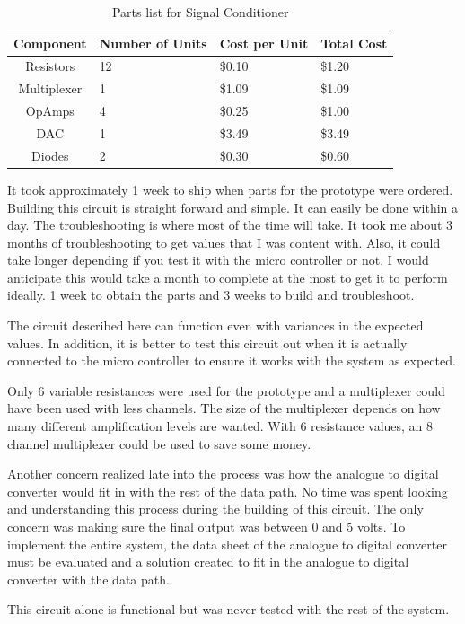 \begin{table}[hbp]
\caption[Signal Conditioner parts]{Parts list for Signal Conditioner}
\begin{center}
\begin{tabular}{c | l | l | l}
	Component & Number of Units & Cost per Unit & Total Cost \\\hline
	Resistors & 12 & \$0.10 & \$1.20 \\ 
	Multiplexer & 1 & \$1.09 & \$1.09 \\
	OpAmps & 4 & \$0.25 & \$1.00 \\
	DAC & 1 & \$3.49 & \$3.49 \\
	Diodes & 2 & \$0.30 & \$0.60
\end{tabular}
\end{center}
\label{tab:analog input parts}
\end{table}

It took approximately 1 week to ship when parts for the prototype were ordered. Building this circuit is straight forward and simple. It can easily be done within a day. The troubleshooting is where most of the time will take. It took me about 3 months of troubleshooting to get values that I was content with. Also, it could take longer depending if you test it with the micro controller or not. I would anticipate this would take a month to complete at the most to get it to perform ideally. 1 week to obtain the parts and 3 weeks to build and troubleshoot.

The circuit described here can function even with variances in the expected values. In addition, it is better to test this circuit out when it is actually connected to the micro controller to ensure it works with the system as expected.

Only 6 variable resistances were used for the prototype and a multiplexer could have been used with less channels. The size of the multiplexer depends on how many different amplification levels are wanted. With 6 resistance values, an 8 channel multiplexer could be used to save some money.

Another concern realized late into the process was how the analogue to digital converter would fit in with the rest of the data path. No time was spent looking and understanding this process during the building of this circuit. The only concern was making sure the final output was between 0 and 5 volts. To implement the entire system, the data sheet of the analogue to digital converter must be evaluated and a solution created to fit in the analogue to digital converter with the data path.

This circuit alone is functional but was never tested with the rest of the system.


